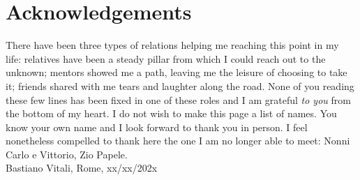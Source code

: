 \thispagestyle{plain}			%
\section*{Acknowledgements}
There have been three types of relations helping me reaching this point in my life: relatives have been a steady pillar from which I could reach out to the unknown; mentors showed me a path, leaving me the leisure of choosing to take it; friends shared with me tears and laughter along the road.
None of you reading these few lines has been fixed in one of these roles and I am grateful \textit{to you} from the bottom of my heart.
I do not wish to make this page a list of names. You know your own name and I look forward to thank you in person.  I feel nonetheless compelled to thank here the one I am no longer able to meet: Nonni Carlo e Vittorio, Zio Papele.\\
\vspace{1.5cm}
\hfill
Bastiano Vitali, Rome, xx/xx/202x

\newpage				%
\thispagestyle{empty}
\mbox{}